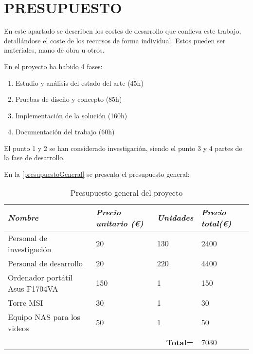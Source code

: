 \section{PRESUPUESTO}

En este apartado se describen los costes de desarrollo que conlleva este trabajo, detallándose el coste de los recursos de forma individual. Estos pueden ser materiales, mano de obra u otros.

En el proyecto ha habido 4 fases:
\begin{enumerate}
    \item Estudio y análisis del estado del arte (45h)
    \item Pruebas de diseño y concepto (85h)
    \item Implementación de la solución (160h)
    \item Documentación del trabajo (60h)
\end{enumerate}

El punto 1 y 2 se han considerado investigación, siendo el punto 3 y 4 partes de la fase de desarrollo.

En la \autoref{presupuestoGeneral} se presenta el presupuesto general:

\begin{table}[H]
    \begin{tabular}{|lll|l|}
    \hline
    \multicolumn{1}{|l|}{\textit{\textbf{Nombre}}} & \multicolumn{1}{l|}{\textit{\textbf{Precio unitario (€)}}} & \textit{\textbf{Unidades}} & \textit{\textbf{Precio total(€)}} \\ \hline
    \multicolumn{1}{|l|}{Personal de investigación}            & \multicolumn{1}{l|}{20}      & 130  & 2400               \\ \hline
    \multicolumn{1}{|l|}{Personal de desarrollo}               & \multicolumn{1}{l|}{20}      & 220  & 4400               \\ \hline
    \multicolumn{1}{|l|}{Ordenador portátil Asus F1704VA}      & \multicolumn{1}{l|}{150}     & 1    & 150                \\ \hline
    \multicolumn{1}{|l|}{Torre MSI}                            & \multicolumn{1}{l|}{30}      & 1    & 30                 \\ \hline
    \multicolumn{1}{|l|}{Equipo NAS para los videos}           & \multicolumn{1}{l|}{50}      & 1    & 50                 \\ \hline
    \multicolumn{3}{|r|}{\textbf{Total=}}                                                            & 7030               \\ \hline
    \end{tabular}
    \caption{Presupuesto general del proyecto}
    \label{presupuestoGeneral}
\end{table}

